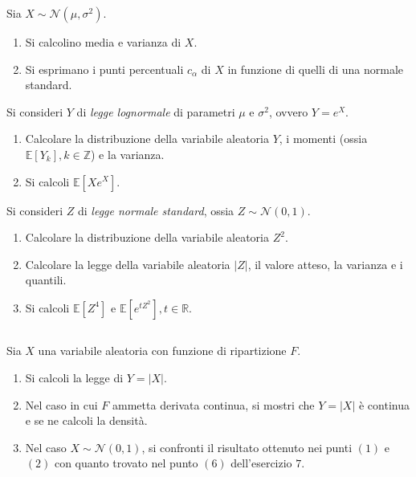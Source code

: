 Sia $X\sim \mathcal{N}\left( \mu ,\sigma ^{2}\right)$.
\begin{enumerate}
\item Si calcolino media e varianza di $X$.
\item Si esprimano i punti percentuali $c_{\alpha }$ di $X$ in funzione di quelli di una normale standard.
\end{enumerate}

Si consideri $Y$ di \textit{legge lognormale} di parametri $\mu $ e $\sigma ^{2}$, ovvero $Y=e^{X}$.
\begin{enumerate}
\item Calcolare la distribuzione della variabile aleatoria $Y$, i momenti (ossia $\mathbb{E}[ Y_{k}] ,k\in \mathbb{Z}$) e la varianza.
\item Si calcoli $\mathbb{E}\left[ Xe^{X}\right]$.
\end{enumerate}

Si consideri $Z$ di \textit{legge normale standard}, ossia $Z\sim \mathcal{N}( 0,1)$.
\begin{enumerate}
\item Calcolare la distribuzione della variabile aleatoria $Z^{2}$.
\item Calcolare la legge della variabile aleatoria $| Z| $, il valore atteso, la varianza e i quantili.
\item Si calcoli $\mathbb{E}\left[ Z^{4}\right]$ e $\mathbb{E}\left[ e^{tZ^{2}}\right] ,t\in \mathbb{R}$.
\end{enumerate}
\subsection{}

Sia $X$ una variabile aleatoria con funzione di ripartizione $F$.
\begin{enumerate}
\item Si calcoli la legge di $Y=| X| $.
\item Nel caso in cui $F$ ammetta derivata continua, si mostri che $Y=| X| $ è continua e se ne calcoli la densità.
\item Nel caso $X\sim \mathcal{N}( 0,1)$, si confronti il risultato ottenuto nei punti $( 1)$ e $( 2)$ con quanto trovato nel punto $( 6)$ dell'esercizio $7$.
\end{enumerate}
